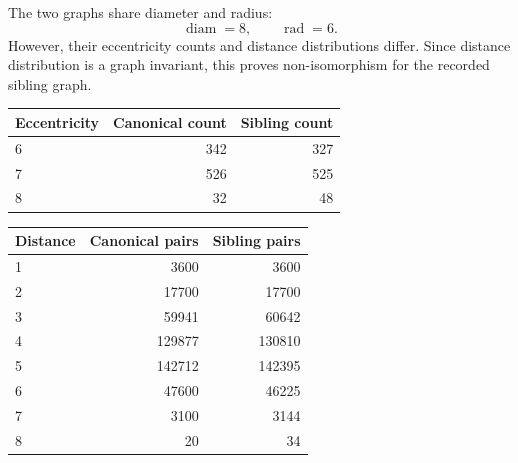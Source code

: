 The two graphs share diameter and radius:
\[
\operatorname{diam}=8,\qquad \operatorname{rad}=6.
\]
However, their eccentricity counts and distance distributions differ. Since distance distribution is a graph invariant, this proves non-isomorphism for the recorded sibling graph.

\begin{center}
\begin{tabular}{lrr}
\toprule
Eccentricity & Canonical count & Sibling count \\
\midrule
6 & 342 & 327 \\
7 & 526 & 525 \\
8 & 32 & 48 \\
\bottomrule
\end{tabular}
\end{center}

\begin{center}
\begin{tabular}{lrr}
\toprule
Distance & Canonical pairs & Sibling pairs \\
\midrule
1 & 3600 & 3600 \\
2 & 17700 & 17700 \\
3 & 59941 & 60642 \\
4 & 129877 & 130810 \\
5 & 142712 & 142395 \\
6 & 47600 & 46225 \\
7 & 3100 & 3144 \\
8 & 20 & 34 \\
\bottomrule
\end{tabular}
\end{center}


